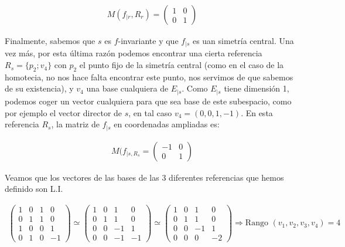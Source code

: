 \begin{gather*}
    M(f_{\mid r}, R_r) = 
    \begin{pmatrix}
    1 & 0\\
    0 & 1
    \end{pmatrix}
\end{gather*}

Finalmente, sabemos que $s$ es $f$-invariante y que $f_{\mid s}$ es uan simetría central. Una vez más, por esta última razón podemos encontrar una cierta referencia $R_s = \{p_2; v_4\}$ con $p_2$ el punto fijo de la simetría central (como en el caso de la homotecia, no nos hace falta encontrar este punto, nos servimos de que sabemos de su existencia), y $v_4$ una base cualquiera de $E_{\mid s}$. Como $E_{\mid s}$ tiene dimensión 1, podemos coger un vector cualquiera para que sea base de este subespacio, como por ejemplo el vector director de $s$, en tal caso $v_4 = (0,0,1,-1)$. En esta referencia $R_s$, la matriz de $f_{\mid s}$ en coordenadas ampliadas es:

\begin{gather*}
    M(f_{\mid s, R_s} = 
    \begin{pmatrix}
    -1 & 0\\
    0 & 1
    \end{pmatrix}
\end{gather*}

Veamos que los vectores de las bases de las 3 diferentes referencias que hemos definido son L.I.

\begin{gather*}
    \begin{pmatrix}
    1 & 0 & 1 & 0\\
    0 & 1 & 1 & 0\\
    1 & 0 & 0 & 1\\
    0 & 1 & 0 & -1
    \end{pmatrix}
    \simeq
    \begin{pmatrix}
    1 & 0 & 1 & 0\\
    0 & 1 & 1 & 0\\
    0 & 0 & -1 & 1\\
    0 & 0 & -1 & -1
    \end{pmatrix}
    \simeq
    \begin{pmatrix}
    1 & 0 & 1 & 0\\
    0 & 1 & 1 & 0\\
    0 & 0 & -1 & 1\\
    0 & 0 & 0 & -2
    \end{pmatrix}
    \Longrightarrow \text{Rango }(v_1,v_2,v_3,v_4) = 4
\end{gather*}
\vspace{2mm}


